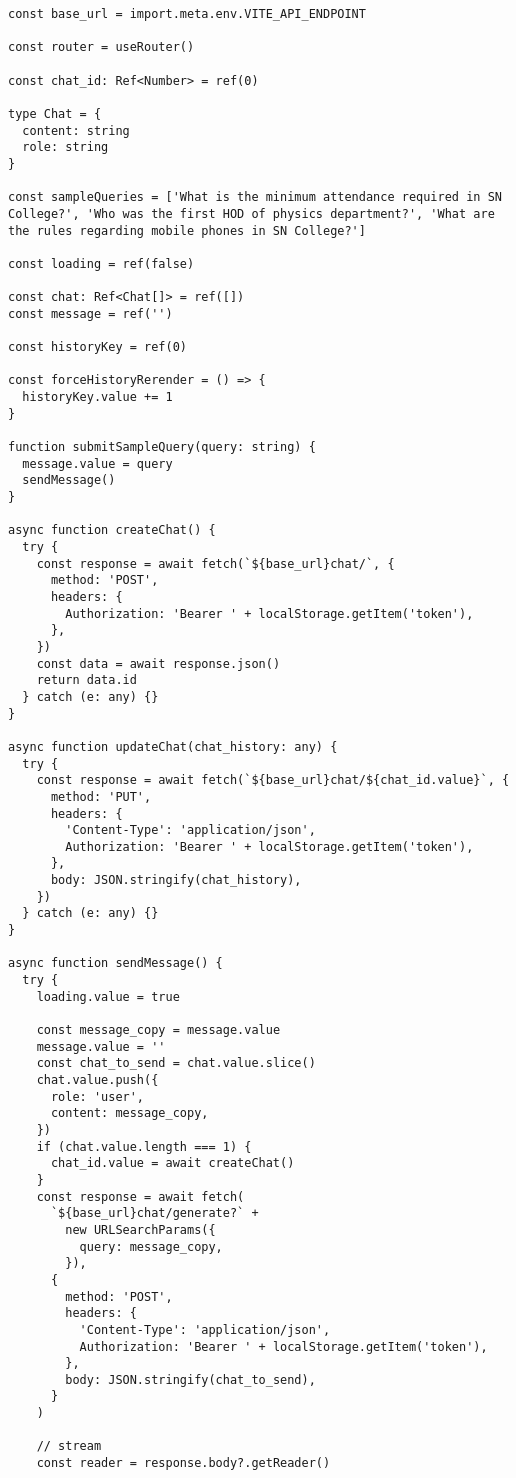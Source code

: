 \begin{Verbatim}[breaklines=true, breakanywhere=true]
const base_url = import.meta.env.VITE_API_ENDPOINT

const router = useRouter()

const chat_id: Ref<Number> = ref(0)

type Chat = {
  content: string
  role: string
}

const sampleQueries = ['What is the minimum attendance required in SN College?', 'Who was the first HOD of physics department?', 'What are the rules regarding mobile phones in SN College?']

const loading = ref(false)

const chat: Ref<Chat[]> = ref([])
const message = ref('')

const historyKey = ref(0)

const forceHistoryRerender = () => {
  historyKey.value += 1
}

function submitSampleQuery(query: string) {
  message.value = query
  sendMessage()
}

async function createChat() {
  try {
    const response = await fetch(`${base_url}chat/`, {
      method: 'POST',
      headers: {
        Authorization: 'Bearer ' + localStorage.getItem('token'),
      },
    })
    const data = await response.json()
    return data.id
  } catch (e: any) {}
}

async function updateChat(chat_history: any) {
  try {
    const response = await fetch(`${base_url}chat/${chat_id.value}`, {
      method: 'PUT',
      headers: {
        'Content-Type': 'application/json',
        Authorization: 'Bearer ' + localStorage.getItem('token'),
      },
      body: JSON.stringify(chat_history),
    })
  } catch (e: any) {}
}

async function sendMessage() {
  try {
    loading.value = true

    const message_copy = message.value
    message.value = ''
    const chat_to_send = chat.value.slice()
    chat.value.push({
      role: 'user',
      content: message_copy,
    })
    if (chat.value.length === 1) {
      chat_id.value = await createChat()
    }
    const response = await fetch(
      `${base_url}chat/generate?` +
        new URLSearchParams({
          query: message_copy,
        }),
      {
        method: 'POST',
        headers: {
          'Content-Type': 'application/json',
          Authorization: 'Bearer ' + localStorage.getItem('token'),
        },
        body: JSON.stringify(chat_to_send),
      }
    )

    // stream
    const reader = response.body?.getReader()


\end{Verbatim}

